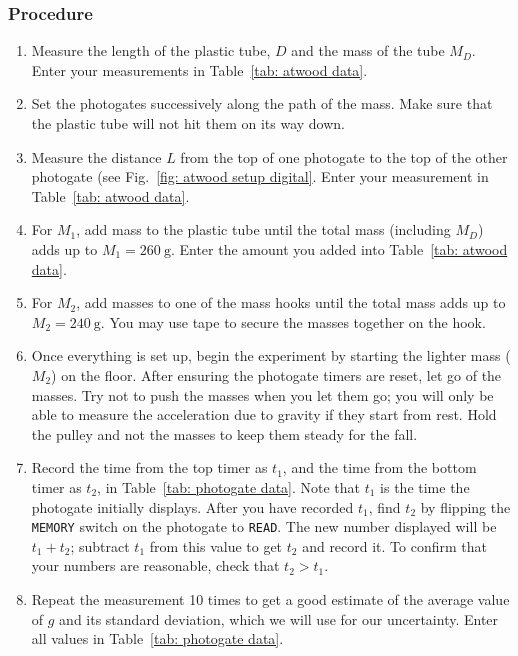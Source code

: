 \documentclass[addpoints]{physlabs}
\begin{document}
\begin{labsection}
\begin{experiment}
\subsubsection*{Procedure}
%
\begin{enumerate}
    \item Measure the length of the plastic tube, $D$ and the mass of the tube $M_D$. Enter your measurements in Table~\ref{tab: atwood data}.
    \item Set the photogates successively along the path of the mass. Make sure that the plastic tube will not hit them on its way down.
    \item Measure the distance $L$ from the top of one photogate to the top of the other photogate (see Fig.~\ref{fig: atwood setup digital}. Enter your measurement in Table~\ref{tab: atwood data}.
    \item For $M_1$, add mass to the plastic tube until the total mass (including $M_D$) adds up to $M_1=\qty{260}{\gram}$. Enter the amount you added into Table~\ref{tab: atwood data}.
    \item For $M_2$, add masses to one of the mass hooks until the total mass adds up to $M_2=\qty{240}{\gram}$. You may use tape to secure the masses together on the hook.
    \item Once everything is set up, begin the experiment by starting the lighter mass ($M_2$) on the floor. After ensuring the photogate timers are reset, let go of the masses. Try not to push the masses when you let them go; you will only be able to measure the acceleration due to gravity if they start from rest. Hold the pulley and not the masses to keep them steady for the fall.
    \item Record the time from the top timer as $t_1$, and the time from the bottom timer as $t_2$, in Table~\ref{tab: photogate data}. Note that $t_1$ is the time the photogate initially displays. After you have recorded $t_1$, find $t_2$ by flipping the \texttt{MEMORY} switch on the photogate to \texttt{READ}. The new number displayed will be $t_1+t_2$; subtract $t_1$ from this value to get $t_2$ and record it. To confirm that your numbers are reasonable, check that $t_2>t_1$.
    \item Repeat the measurement 10 times to get a good estimate of the average value of $g$ and its standard deviation, which we will use for our uncertainty. Enter all values in Table~\ref{tab: photogate data}.
\end{enumerate}


\end{experiment}
\end{labsection}
\end{document}
